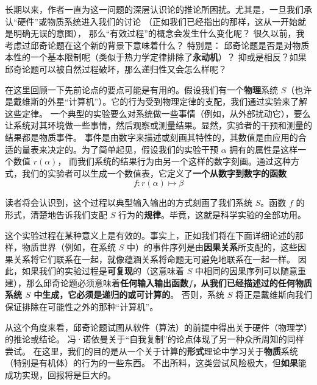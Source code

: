 \documentclass[a4paper,12pt]{article}
\begin{document}
长期以来，作者一直为这一问题的深层认识论的推论所困扰\cite{RosenR1962}。尤其是，一旦我们承认“\gls{硬件}”或\gls{物质系统}进入我们的讨论
（正如我们已经指出的那样，这从一开始就是明确无误的意图）， 那么“\gls{有效过程}”的概念会发生什么变化呢？
很久以前\cite{RosenR1962}，我考虑过\gls{邱奇论题}在这个新的背景下意味着什么？ 特别是：
邱奇论题是否是对\gls{物质}本性的一个基本限制呢（类似于热力学定律排除了\textbf{永动机}）？
抑或是相反？如果邱奇论题可以被自然过程破坏，那么递归性又会怎么样呢？

在这里回顾一下先前论点的要点可能是有用的。假设我们有一个\textbf{物理}系统 $S$（也许是戴维斯的外星“计算机”）。它的行为受到物理定律的支配，我们通过实验来了解这些定律。
一个典型的实验要么对系统做一些事情（例如，从外部扰动它），要么让系统对其环境做一些事情，然后\gls{观察}或\gls{测量}结果。显然，实验者的\gls{干预}和\gls{测量}的结果都是\gls{物质事件}。
\gls{事件}是由数字来描述或刻画其特性的，其数值是由应用的合适的量表来决定的\cite{RosenR1978}。为了简单起见，假设我们的实验干预 $\alpha$ 拥有的属性是这样一个数值 $r(\alpha)$，
而我们系统的结果行为由另一个这样的数字刻画。通过这种方式，我们的实验者可以生成一个数值表，它定义了\textbf{一个从数字到数字的函数}  \begin{equation}\label{eq:1} f: r(\alpha) \mapsto \beta\end{equation}

读者将会认识到，这个过程以典型输入输出的方式刻画了我们系统 $S$。函数 $f$ 的形式，清楚地告诉我们支配 $S$ 行为的\textbf{规律}。毕竟，这就是\gls{科学实验}的全部功用。

这个实验过程在某种意义上是有效的。事实上，正如我们将在下面详细论述的那样，\gls{物质世界}（例如，在系统 $S$ 中）的\gls{事件序列}是由\textbf{\gls{因果关系}}所支配的，这些因果关系将它们联系在一起，就像\gls{蕴涵关系}将命题无可避免地联系在一起一样。
因此，如果我们的实验过程是\textbf{\gls{可复现}}的（这意味着 $S$ 中相同的\gls{因果序列}可以随意重建），那么\gls{邱奇论题}必须意味着\textbf{任何输入输出函数\hyperref[eq:1]{$f$}，从我们已经描述过的任何\gls{物质系统} $S$ 中\gls{生成}，它必须是递归的或\gls{可计算}的}。
否则，系统 $S$ 将正是戴维斯向我们保证排除在可能性之外的那种“计算机”。

从这个角度来看，\gls{邱奇论题}试图从\gls{软件}（\gls{算法}）的前提中得出关于\gls{硬件}（物理学）的推论或结论。
冯·诺依曼关于“自我复制”的论点\cite{BurksA1966}体现了另一种众所周知的同样尝试。
在这里，我们的目的是从一个关于计算的\textbf{\gls{形式}}理论中学习关于\textbf{\gls{物质}}系统（特别是有机体）的行为的一些东西。
不出所料，这类尝试风险极大，但\textbf{如果}能成功实现，回报将是巨大的。
\end{document}
